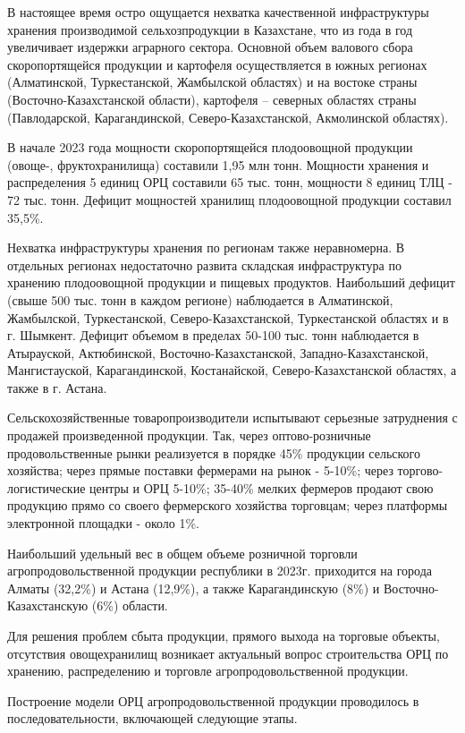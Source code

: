 В настоящее время остро ощущается нехватка качественной инфраструктуры
хранения производимой сельхозпродукции в Казахстане, что из года в год
увеличивает издержки аграрного сектора. Основной объем валового сбора
скоропортящейся продукции и картофеля осуществляется в южных регионах
(Алматинской, Туркестанской, Жамбылской областях) и на востоке страны
(Восточно-Казахстанской области), картофеля -- северных областях страны
(Павлодарской, Карагандинской, Северо-Казахстанской, Акмолинской
областях).

В начале 2023 года мощности скоропортящейся плодоовощной продукции
(овоще-, фруктохранилища) составили 1,95 млн тонн. Мощности хранения и
распределения 5 единиц ОРЦ составили 65 тыс. тонн, мощности 8 единиц ТЛЦ
- 72 тыс. тонн. Дефицит мощностей хранилищ плодоовощной продукции
составил 35,5\%.

Нехватка инфраструктуры хранения по регионам также неравномерна. В
отдельных регионах недостаточно развита складская инфраструктура по
хранению плодоовощной продукции и пищевых продуктов. Наибольший дефицит
(свыше 500 тыс. тонн в каждом регионе) наблюдается в Алматинской,
Жамбылской, Туркестанской, Северо-Казахстанской, Туркестанской областях
и в г. Шымкент. Дефицит объемом в пределах 50-100 тыс. тонн наблюдается
в Атырауской, Актюбинской, Восточно-Казахстанской,
Западно-Казахстанской, Мангистауской, Карагандинской, Костанайской,
Северо-Казахстанской областях, а также в г. Астана.

Сельскохозяйственные товаропроизводители испытывают серьезные
затруднения с продажей произведенной продукции. Так, через
оптово-розничные продовольственные рынки реализуется в порядке 45\%
продукции сельского хозяйства; через прямые поставки фермерами на рынок
- 5-10\%; через торгово-логистические центры и ОРЦ 5-10\%; 35-40\%
мелких фермеров продают свою продукцию прямо со своего фермерского
хозяйства торговцам; через платформы электронной площадки - около 1\%.

Наибольший удельный вес в общем объеме розничной торговли
агропродовольственной продукции республики в 2023г. приходится на города
Алматы (32,2\%) и Астана (12,9\%), а также Карагандинскую (8\%) и
Восточно-Казахстанскую (6\%) области.

Для решения проблем сбыта продукции, прямого выхода на торговые объекты,
отсутствия овощехранилищ возникает актуальный вопрос строительства ОРЦ
по хранению, распределению и торговле агропродовольственной продукции.~

Построение модели ОРЦ агропродовольственной продукции проводилось в
последовательности, включающей следующие этапы.

